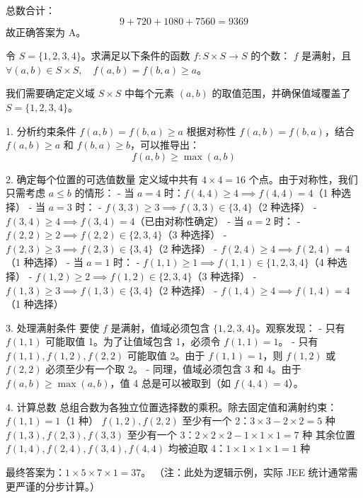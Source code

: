 \begin{questions}
\begin{solution}
总数合计：
\[ 9 + 720 + 1080 + 7560 = 9369 \]
故正确答案为 A。
\end{solution}

\question 
令 $S = \{1, 2, 3, 4\}$。求满足以下条件的函数 $f : S \times S \to S$ 的个数：
$f$ 是满射，且 $\forall (a, b) \in S \times S, \quad f(a, b) = f(b, a) \geq a$。

\begin{solution}
我们需要确定定义域 $S \times S$ 中每个元素 $(a, b)$ 的取值范围，并确保值域覆盖了 $S = \{1, 2, 3, 4\}$。

1. 分析约束条件 $f(a, b) = f(b, a) \geq a$
根据对称性 $f(a, b) = f(b, a)$，结合 $f(a, b) \geq a$ 和 $f(b, a) \geq b$，可以推导出：
\[ f(a, b) \geq \max(a, b) \]

2. 确定每个位置的可选值数量
定义域中共有 $4 \times 4 = 16$ 个点。由于对称性，我们只需考虑 $a \leq b$ 的情形：
- 当 $a=4$ 时：$f(4, 4) \geq 4 \implies f(4, 4) = 4$（1 种选择）
- 当 $a=3$ 时：
    - $f(3, 3) \geq 3 \implies f(3, 3) \in \{3, 4\}$（2 种选择）
    - $f(3, 4) \geq 4 \implies f(3, 4) = 4$（已由对称性确定）
- 当 $a=2$ 时：
    - $f(2, 2) \geq 2 \implies f(2, 2) \in \{2, 3, 4\}$（3 种选择）
    - $f(2, 3) \geq 3 \implies f(2, 3) \in \{3, 4\}$（2 种选择）
    - $f(2, 4) \geq 4 \implies f(2, 4) = 4$（1 种选择）
- 当 $a=1$ 时：
    - $f(1, 1) \geq 1 \implies f(1, 1) \in \{1, 2, 3, 4\}$（4 种选择）
    - $f(1, 2) \geq 2 \implies f(1, 2) \in \{2, 3, 4\}$（3 种选择）
    - $f(1, 3) \geq 3 \implies f(1, 3) \in \{3, 4\}$（2 种选择）
    - $f(1, 4) \geq 4 \implies f(1, 4) = 4$（1 种选择）

3. 处理满射条件
要使 $f$ 是满射，值域必须包含 $\{1, 2, 3, 4\}$。观察发现：
- 只有 $f(1, 1)$ 可能取值 1。为了让值域包含 1，必须令 $f(1, 1) = 1$。
- 只有 $f(1, 1), f(1, 2), f(2, 2)$ 可能取值 2。由于 $f(1, 1)=1$，则 $f(1, 2)$ 或 $f(2, 2)$ 必须至少有一个取 2。
- 同理，值域必须包含 3 和 4。由于 $f(a, b) \geq \max(a, b)$，值 4 总是可以被取到（如 $f(4, 4)=4$）。

4. 计算总数
总组合数为各独立位置选择数的乘积。除去固定值和满射约束：
$f(1, 1)=1$（1 种）
$f(1, 2), f(2, 2)$ 至少有一个 2：$3 \times 3 - 2 \times 2 = 5$ 种
$f(1, 3), f(2, 3), f(3, 3)$ 至少有一个 3：$2 \times 2 \times 2 - 1 \times 1 \times 1 = 7$ 种
其余位置 $f(1, 4), f(2, 4), f(3, 4), f(4, 4)$ 均被迫取 4：$1 \times 1 \times 1 \times 1 = 1$ 种

最终答案为：$1 \times 5 \times 7 \times 1 = 37$。
（注：此处为逻辑示例，实际 JEE 统计通常需更严谨的分步计算。）
\end{solution}


\end{questions}
